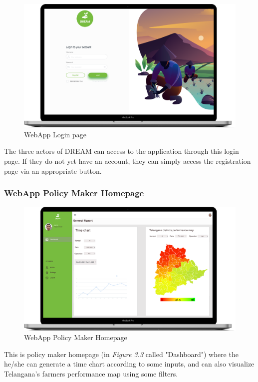 \begin{figure}[H]
  \centering
  \centerline{\includegraphics[width=140mm,scale=0.9]{./Images//Mocks/WebApp/Login.png}}
  \caption{WebApp Login page}
\end{figure}

The three actors of DREAM can access to the application through this login page. If they do not yet have an account, they can simply access the registration page via an appropriate button.

\subsubsection{WebApp Policy Maker Homepage}

\begin{figure}[H]
  \centering
  \centerline{\includegraphics[width=140mm,scale=0.9]{./Images//Mocks/WebApp/PolicyMaker.png}}
  \caption{WebApp Policy Maker Homepage}
\end{figure}

This is policy maker homepage (in \textit{Figure 3.3} called "Dashboard") where the he/she can generate a time chart according to some inputs, and can also visualize Telangana's farmers performance map using some filters.

